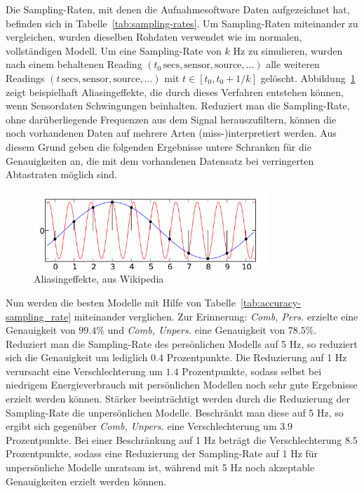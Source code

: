 Die Sampling-Raten, mit denen die Aufnahmesoftware Daten aufgezeichnet hat, befinden sich in Tabelle~\ref{tab:sampling-rates}. Um Sampling-Raten miteinander zu vergleichen, wurden dieselben Rohdaten verwendet wie im normalen, vollständigen Modell. Um eine Sampling-Rate von $k$ Hz zu simulieren, wurden nach einem behaltenen Reading $(t_0\,\text{secs}, \text{sensor}, \text{source}, ...)$ alle weiteren Readings $(t\,\text{secs}, \text{sensor}, \text{source}, ...)$ mit $t \in [t_0, t_0 + 1/k]$ gelöscht. Abbildung~\ref{fig:aliasing} zeigt beispielhaft Aliasingeffekte, die durch dieses Verfahren entstehen können, wenn Sensordaten Schwingungen beinhalten. Reduziert man die Sampling-Rate, ohne darüberliegende Frequenzen aus dem Signal herauszufiltern, können die noch vorhandenen Daten auf mehrere Arten (miss-)interpretiert werden. Aus diesem Grund geben die folgenden Ergebnisse untere Schranken für die Genauigkeiten an, die mit dem vorhandenen Datensatz bei verringerten Abtastraten möglich sind.

\begin{figure}[h]
	\centering
	\includegraphics[width=250pt]{img/aliasing}
	\caption{Aliasingeffekte, aus Wikipedia \cite{Moxfyre2009Aliasing}}
	\label{fig:aliasing}
\end{figure}

Nun werden die besten Modelle mit Hilfe von Tabelle~\ref{tab:accuracy-sampling_rate} miteinander verglichen. Zur Erinnerung: \textit{Comb, Pers.} erzielte eine Genauigkeit von $99.4 \%$ und \textit{Comb, Unpers.} eine Genauigkeit von $78.5 \%$. Reduziert man die Sampling-Rate des persönlichen Modells auf 5 Hz, so reduziert sich die Genauigkeit um lediglich $0.4$ Prozentpunkte. Die Reduzierung auf 1 Hz verursacht eine Verschlechterung um $1.4$ Prozentpunkte, sodass selbst bei niedrigem Energieverbrauch mit persönlichen Modellen noch sehr gute Ergebnisse erzielt werden können. Stärker beeinträchtigt werden durch die Reduzierung der Sampling-Rate die unpersönlichen Modelle. Beschränkt man diese auf 5 Hz, so ergibt sich gegenüber \textit{Comb, Unpers.} eine Verschlechterung um $3.9$ Prozentpunkte. Bei einer Beschränkung auf 1 Hz beträgt die Verschlechterung $8.5$ Prozentpunkte, sodass eine Reduzierung der Sampling-Rate auf 1 Hz für unpersönliche Modelle unratsam ist, während mit 5 Hz noch akzeptable Genauigkeiten erzielt werden können.

